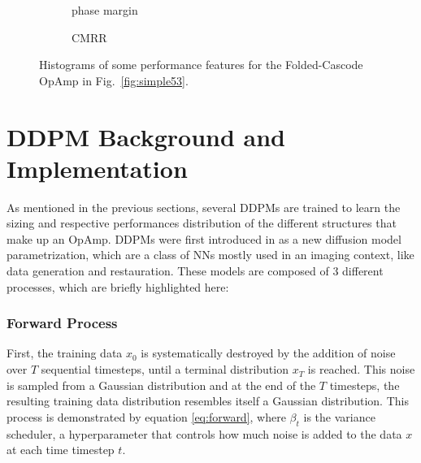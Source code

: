 \documentclass[conference]{IEEEtran}
\begin{document}
\begin{figure}[]
\begin{subfigure}{0.12\textwidth}
		\vspace{-1.4\baselineskip}
		\caption{{\footnotesize phase margin}}
		\label{fig:53ph}
		\end{subfigure}
		\hfill
		\begin{subfigure}{0.12\textwidth}
		\vspace{-1.4\baselineskip}
		\caption{{\footnotesize CMRR}}
		\label{fig:53cmrr}
		\end{subfigure}
		\setlength{\abovecaptionskip}{4ex}%
		\setlength{\belowcaptionskip}{-4ex}%
		\caption{Histograms of some performance features for the Folded-Cascode OpAmp in Fig.~\ref{fig:simple53}.}
		\label{fig:perffeatures53}
		\end{figure}
	
\section{DDPM Background and Implementation}\label{sec:ddpm}
	As mentioned in the previous sections, several DDPMs are trained to learn the sizing and respective performances distribution of the different structures that make up an OpAmp. DDPMs were first introduced in \cite{ho2020denoisingdiffusionprobabilisticmodels} as a new diffusion model parametrization, which are a class of NNs mostly used in an imaging context, like data generation and restauration. These models are composed of 3 different processes, which are briefly highlighted here:
	
	\subsubsection{Forward Process}
	First, the training data $x_{0}$ is systematically destroyed by the addition of noise over $T$ sequential timesteps, until a terminal distribution $x_{T}$ is reached. This noise is sampled from a Gaussian distribution and at the end of the $T$ timesteps, the resulting training data distribution resembles itself a Gaussian distribution. This process is demonstrated by equation \ref{eq:forward}, where $\beta_{t}$ is the variance scheduler, a hyperparameter that controls how much noise is added to the data $x$ at each time timestep $t$.
	
\end{document}
